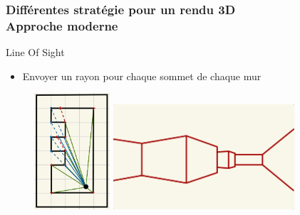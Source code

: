 \documentclass{beamer}
\begin{document}
\begin{frame}
    \frametitle{Différentes stratégie pour un rendu 3D \\
                \small Approche moderne}    
                
    
    \begin{block}{Line Of Sight}
        \begin{itemize} 
            \item Envoyer un rayon pour chaque sommet de chaque mur
        \end{itemize}

    \end{block}    


    \begin{figure}
        \center
        \includegraphics[width=0.25\textwidth]{images/projection-2D-V2.jpeg}
        \raisebox{2cm}{
            \hspace{2mm}$\Longrightarrow$\hspace{2mm}
        }
        \includegraphics[width=0.6\textwidth]{images/rendu-sans-texture.jpeg}
    \end{figure}
\end{frame}
\end{document}
